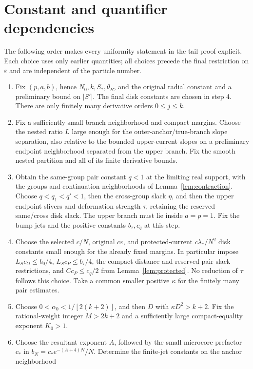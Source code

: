 \documentclass[11pt]{article}
\numberwithin{equation}{section}
\theoremstyle{definition}
\newcommand{\eps}{\varepsilon}
\begin{document}
\section{Constant and quantifier dependencies}\label{app:constants}
The following order makes every uniformity statement in the tail
proof explicit. Each choice uses only earlier quantities; all choices
precede the final restriction on \(\eps\) and are independent
of the particle number.
\begin{enumerate}
\item Fix \((p,a,b)\), hence \(N_0,k,S_*,\theta_B\), and the
original radial constant and a preliminary bound on \(|S'|\).
The final disk constants are chosen in step 4. There are only finitely many
derivative orders \(0\le j\le k\).
\item Fix a sufficiently small branch neighborhood and compact
margins. Choose the nested ratio \(L\) large enough for the
outer-anchor/true-branch slope separation, also relative to the
bounded upper-current slopes on a preliminary endpoint neighborhood
separated from the upper branch. Fix the smooth nested
partition and all of its finite derivative bounds.
\item Obtain the same-group pair constant \(q<1\) at the limiting
real support, with the groups and continuation neighborhoods of
Lemma~\ref{lem:contraction}. Choose \(q<q_1<q'<1\), then the cross-group slack
\(\eta\), and then the upper endpoint slivers and deformation
strength \(\tau\), retaining the reserved same/cross disk slack.
The upper branch must lie inside \(a=p=1\). Fix the bump jets
and the positive constants \(b_\tau,c_q\) at this step.
\item Choose the selected \(c/N\), original \(c\eps\), and
protected-current \(c\lambda_*/N^2\) disk constants small enough
for the already fixed margins. In particular impose
\(L_Sc_O\le b_0/4\), \(L_Sc_P\le b_\tau/4\), the
compact-distance and reserved pair-slack restrictions, and
\(Cc_P\le c_q/2\) from Lemma~\ref{lem:protected}.
No reduction of \(\tau\) follows this choice. Take a common smaller positive
\(\kappa\) for the finitely many pair estimates.
\item Choose \(0<\alpha_0<1/[2(k+2)]\), and then \(D\) with
\(\kappa D^2>k+2\). Fix the rational-weight integer \(M>2k+2\)
and a sufficiently large compact-equality exponent \(K_0>1\).
\item Choose the resultant exponent \(A\), followed by the small
microcore prefactor \(c_*\) in \(b_N=c_*e^{-(A+4)N}/N\).
Determine the finite-jet constants on the anchor neighborhood

\end{enumerate}
\end{document}

